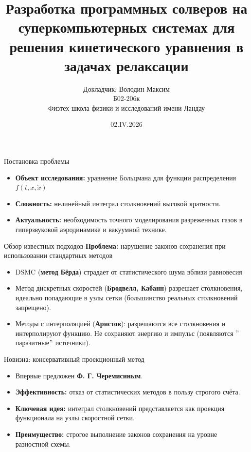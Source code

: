 \documentclass[aspectratio=169]{beamer}
\title[Решение задач релаксации]{Разработка программных солверов на суперкомпьютерных системах для
решения кинетического уравнения в задачах релаксации}
\author[Володин М.В.]{Докладчик: Володин Максим \\
Б02-206к \\
Физтех-школа физики и исследований имени Ландау}
\institute[МФТИ]{Московский физико-технический институт}
\date{02.IV.2026}
\begin{document}
    \begin{frame}
        \titlepage
    \end{frame}

    \begin{frame}{Постановка проблемы}
        \begin{itemize}
            \item \textbf{Объект исследования:} уравнение Больцмана для функции распределения~~$f(t, x, \dot{x})$
            \item \textbf{Сложность:} нелинейный интеграл столкновений высокой кратности.
            \item \textbf{Актуальность:} необходимость точного моделирования разреженных газов в гиперзвуковой
            аэродинамике и вакуумной технике.
        \end{itemize}
    \end{frame}
    
    \begin{frame}{Обзор известных подходов}
        \textbf{Проблема:} нарушение законов сохранения при использовании стандартных методов
        \begin{itemize}
            \item DSMC (\textbf{метод Бёрда}) страдает от статистического шума вблизи равновесия
            \item Метод дискретных скоростей (\textbf{Бродвелл, Кабанн}) разрешает столкновения, идеально попадающие
            в узлы сетки (большинство реальных столкновений запрещено).
            \item Методы с интерполяцией (\textbf{Аристов}): разрешаются все столкновения и интерполируют функцию.
            Не сохраняют энергию и импульс (появляются \("\)паразитные\("\) источники).
        \end{itemize}
    
    \end{frame}

    \begin{frame}{Новизна: консервативный проекционный метод}
        \begin{itemize}
            \item Впервые предложен \textbf{Ф. Г. Черемисиным}.
            \item \textbf{Эффективность:} отказ от статистических методов в пользу строгого счёта.
            \item \textbf{Ключевая идея:} интеграл столкновений представляется как проекция функционала на узлы
            скоростной сетки.
            \item \textbf{Преимущество:} строгое выполнение законов сохранения на уровне разностной схемы.
        \end{itemize}
    \end{frame}
\end{document}

